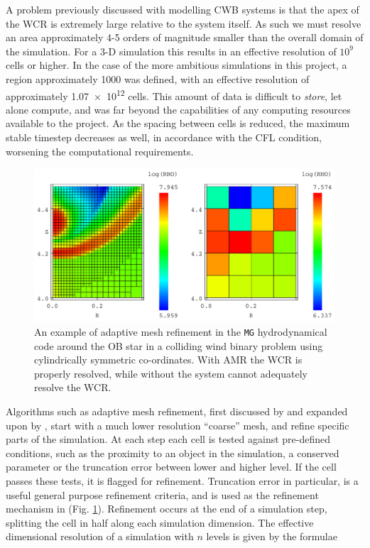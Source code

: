 A problem previously discussed with modelling CWB systems is that the apex of the WCR is extremely large relative to the system itself.
As such we must resolve an area approximately 4-5 orders of magnitude smaller than the overall domain of the simulation.
For a 3-D simulation this results in an effective resolution of $10^9$ cells or higher.
In the case of the more ambitious simulations in this project, a region approximately \SI{1000}{\au} was defined, with an effective resolution of approximately \num{1.07e12} cells.
This amount of data is difficult to \emph{store}, let alone compute, and was far beyond the capabilities of any computing resources available to the project.
As the spacing between cells is reduced, the maximum stable timestep decreases as well, in accordance with the CFL condition, worsening the computational requirements.

\begin{figure}[h]
  \centering
  \includegraphics[width=5in]{assets/mergecellc.pdf}
  \caption[Adaptive mesh refinement comparison]{An example of adaptive mesh refinement in the \texttt{MG} hydrodynamical code around the OB star in a colliding wind binary problem using cylindrically symmetric co-ordinates. With AMR the WCR is properly resolved, while without the system cannot adequately resolve the WCR.}
  \label{fig:mgrefine}
\end{figure}

Algorithms such as adaptive mesh refinement, first discussed by \textcite{bergerAdaptiveMeshRefinement1984} and expanded upon by \textcite{bergerLocalAdaptiveMesh1989}, start with a much lower resolution ``coarse'' mesh, and refine specific parts of the simulation.
At each step each cell is tested against pre-defined conditions, such as the proximity to an object in the simulation, a conserved parameter or the truncation error between lower and higher level.
If the cell passes these tests, it is flagged for refinement.
Truncation error in particular, is a useful general purpose refinement criteria, and is used as the refinement mechanism in \mg (Fig. \ref{fig:mgrefine}).
Refinement occurs at the end of a simulation step, splitting the cell in half along each simulation dimension.
The effective dimensional resolution of a simulation with $n$ levels is given by the formulae


